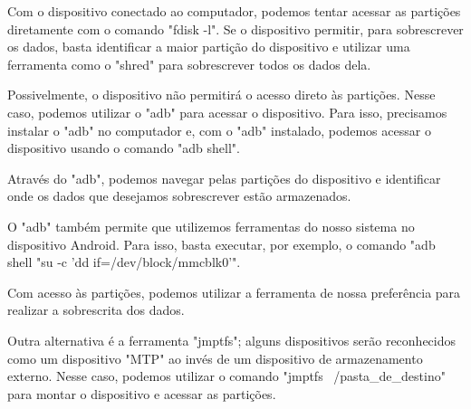 Com o dispositivo conectado ao computador, podemos tentar acessar as partições diretamente com o comando "fdisk -l". Se o dispositivo permitir, para sobrescrever os dados, basta identificar a maior partição do dispositivo e utilizar uma ferramenta como o "shred" para sobrescrever todos os dados dela.

Possivelmente, o dispositivo não permitirá o acesso direto às partições. Nesse caso, podemos utilizar o "adb" para acessar o dispositivo. Para isso, precisamos instalar o "adb" no computador e, com o "adb" instalado, podemos acessar o dispositivo usando o comando "adb shell".

Através do "adb", podemos navegar pelas partições do dispositivo e identificar onde os dados que desejamos sobrescrever estão armazenados.

O "adb" também permite que utilizemos ferramentas do nosso sistema no dispositivo Android. Para isso, basta executar, por exemplo, o comando "adb shell "su -c 'dd if=/dev/block/mmcblk0'".

Com acesso às partições, podemos utilizar a ferramenta de nossa preferência para realizar a sobrescrita dos dados.

Outra alternativa é a ferramenta "jmptfs"; alguns dispositivos serão reconhecidos como um dispositivo "MTP" ao invés de um dispositivo de armazenamento externo. Nesse caso, podemos utilizar o comando "jmptfs ~/pasta\_de\_destino" para montar o dispositivo e acessar as partições.